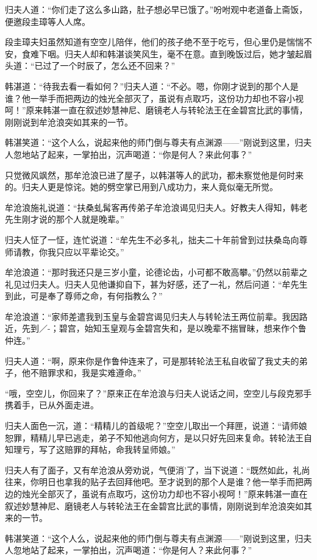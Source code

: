\documentclass[12pt,oneside]{book}
\begin{document}
归夫人道：``你们走了这么多山路，肚子想必早已饿了。''吩咐观中老道备上斋饭，便邀段圭璋等人人席。

段圭璋夫妇虽然知道有空空儿陪伴，他们的孩子绝不至于吃亏，但心里仍是惴惴不安，食难下咽。归夫人却和韩湛谈笑风生，毫不在意。直到晚饭过后，她才皱起眉头道：``已过了一个时辰了，怎么还不回来？''

韩湛道：``待我去看一看如何？''归夫人道：``不必。嗯，你刚才说到的那个人是谁？他一举手而把两边的烛光全部灭了，虽说有点取巧，这份功力却也不容小视呵！''原来韩湛一直在叙述妙慧神尼、磨镜老人与转轮法王在金碧宫比武的事情，刚刚说到牟沧浪突如其来的一节。

韩湛笑道：``这个人么，说起来他的师门倒与尊夫有点渊源------''刚说到这里，归夫人忽地站了起来，一掌拍出，沉声喝道：``你是何人？来此何事？''

只觉微风飒然，那牟沧浪已进了屋子，以韩湛等人的武功，都未察觉他是何时来的。归夫人更是惊诧。她的劈空掌已用到八成功力，来人竟似毫无所觉。

牟沧浪施礼说道：``扶桑虬髯客再传弟子牟沧浪谒见归夫人。好教夫人得知，韩老先生刚才说的那个人就是晚辈。''

归夫人怔了一怔，连忙说道：``牟先生不必多礼，拙夫二十年前曾到过扶桑岛向尊师请教，你我只应以平辈论交。''

牟沧浪道：``那时我还只是三岁小童，论德论齿，小可都不敢高攀。''仍然以前辈之礼见过归夫人。归夫人见他谦抑自下，甚为好感，还了一礼，然后问道：``牟先生到此，可是奉了尊师之命，有何指教么？''

牟沧浪道：``家师差遣我到玉皇与金碧宫谒见归夫人与转轮法王两位前辈。我因路近，先到／-；碧宫，始知玉皇观与金碧宫失和，是以晚辈不揣冒昧，想来作个鲁仲连。''

归夫人道：``啊，原来你是作鲁仲连来了，可是那转轮法王私自收留了我丈夫的弟子，他不赔罪求和，我是实难遵命。''

``哦，空空儿，你回来了？''原来正在牟沧浪与归夫人说话之间，空空儿与段克邪手携着手，已从外面走进。

归夫人面色一沉，道：``精精儿的首级呢？''空空儿取出一个拜匣，说道：``请师娘恕罪，精精儿早已逃走，弟子不知他逃向何方，是以只好先回来复命。转轮法王自知理亏，写了这赔罪的拜帖，命我转呈师娘。''

归夫人有了面子，又有牟沧浪从旁劝说，气便消'了，当下说道：``既然如此，礼尚往来，你明日也拿我的贴子去回拜他吧。至才说到的那个人是谁？他一举手而把两边的烛光全部灭了，虽说有点取巧，这份功力却也不容小视呵！''原来韩湛一直在叙述妙慧神尼、磨镜老人与转轮法王在金碧宫比武的事情，刚刚说到牟沧浪突如其来的一节。

韩湛笑道：``这个人么，说起来他的师门倒与尊夫有点渊源------''刚说到这里，归夫人忽地站了起来，一掌拍出，沉声喝道：``你是何人？来此何事？''
\end{document}

